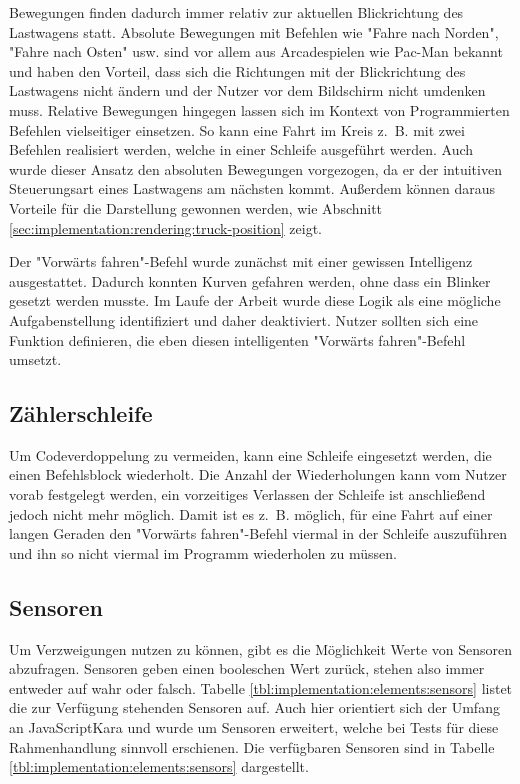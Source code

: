 Bewegungen finden dadurch immer relativ zur aktuellen Blickrichtung des Lastwagens statt. Absolute Bewegungen mit Befehlen wie "Fahre nach Norden", "Fahre nach Osten" usw. sind vor allem aus Arcadespielen wie Pac-Man bekannt und haben den Vorteil, dass sich die Richtungen mit der Blickrichtung des Lastwagens nicht ändern und der Nutzer vor dem Bildschirm nicht umdenken muss. Relative Bewegungen hingegen lassen sich im Kontext von Programmierten Befehlen vielseitiger einsetzen. So kann eine Fahrt im Kreis z.~B. mit zwei Befehlen realisiert werden, welche in einer Schleife ausgeführt werden. Auch wurde dieser Ansatz den absoluten Bewegungen vorgezogen, da er der intuitiven Steuerungsart eines Lastwagens am nächsten kommt. Außerdem können daraus Vorteile für die Darstellung gewonnen werden, wie Abschnitt \ref{sec:implementation:rendering:truck-position} zeigt.

Der "Vorwärts fahren"-Befehl wurde zunächst mit einer gewissen Intelligenz ausgestattet. Dadurch konnten Kurven gefahren werden, ohne dass ein Blinker gesetzt werden musste. Im Laufe der Arbeit wurde diese Logik als eine mögliche Aufgabenstellung identifiziert und daher deaktiviert. Nutzer sollten sich eine Funktion definieren, die eben diesen intelligenten "Vorwärts fahren"-Befehl umsetzt.

\subsection*{Zählerschleife}
\label{sec:implementation:elements:for}

Um Codeverdoppelung zu vermeiden, kann eine Schleife eingesetzt werden, die einen Befehlsblock wiederholt. Die Anzahl der Wiederholungen kann vom Nutzer vorab festgelegt werden, ein vorzeitiges Verlassen der Schleife ist anschließend jedoch nicht mehr möglich. Damit ist es z.~B. möglich, für eine Fahrt auf einer langen Geraden den "Vorwärts fahren"-Befehl viermal in der Schleife auszuführen und ihn so nicht viermal im Programm wiederholen zu müssen.

\subsection*{Sensoren}
\label{sec:implementation:elements:sensors}

Um Verzweigungen nutzen zu können, gibt es die Möglichkeit Werte von Sensoren abzufragen. Sensoren geben einen booleschen Wert zurück, stehen also immer entweder auf wahr oder falsch. Tabelle \ref{tbl:implementation:elements:sensors} listet die zur Verfügung stehenden Sensoren auf. Auch hier orientiert sich der Umfang an JavaScriptKara und wurde um Sensoren erweitert, welche bei Tests für diese Rahmenhandlung sinnvoll erschienen. Die verfügbaren Sensoren sind in Tabelle \ref{tbl:implementation:elements:sensors} dargestellt.

